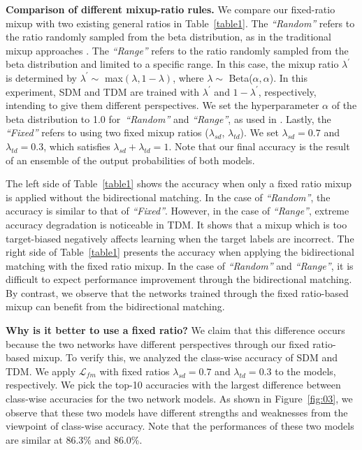 \documentclass[final]{cvpr}
\begin{document}
\textbf{Comparison of different mixup-ratio rules.} We compare our fixed-ratio mixup with two existing general ratios in Table~\ref{table1}. The \emph{“Random”} refers to the ratio randomly sampled from the beta distribution, as in the traditional mixup approaches \cite{MixUp, MiCo2020, VMT, Minghao2020}. The \emph{“Range”} refers to the ratio randomly sampled from the beta distribution and limited to a specific range. In this case, the mixup ratio $\lambda^{\prime}$ is determined by $\lambda^{\prime}\sim$ max$(\lambda, 1- \lambda)$, where $\lambda\sim$ Beta($\alpha,\alpha$). In this experiment, SDM and TDM are trained with $\lambda^{\prime}$ and $1-\lambda^{\prime}$, respectively, intending to give them different perspectives. We set the hyperparameter $\alpha$ of the beta distribution to 1.0 for~\emph{“Random”} and \emph{“Range”}, as used in \cite{MiCo2020, VMT}. Lastly, the \emph{“Fixed”} refers to using two fixed mixup ratios ($\lambda_{sd}$, $\lambda_{td}$). We set $\lambda_{sd}=0.7$ and $\lambda_{td}=0.3$, which satisfies $\lambda_{sd}+\lambda_{td}=1$. Note that our final accuracy is the result of an ensemble of the output probabilities of both models.

The left side of Table~\ref{table1} shows the accuracy when only a fixed ratio mixup is applied without the bidirectional matching. In the case of \emph{“Random”}, the accuracy is similar to that of \emph{“Fixed”}. However, in the case of \emph{“Range”}, extreme accuracy degradation is noticeable in TDM. It shows that a mixup which is too target-biased negatively affects learning when the target labels are incorrect. The right side of Table~\ref{table1} presents the accuracy when applying the bidirectional matching with the fixed ratio mixup. In the case of \emph{“Random”} and \emph{“Range”}, it is difficult to expect performance improvement through the bidirectional matching. By contrast, we observe that the networks trained through the fixed ratio-based mixup can benefit from the bidirectional matching.  

\textbf{Why is it better to use a fixed ratio?} We claim that this difference occurs because the two networks have different perspectives through our fixed ratio-based mixup. To verify this, we analyzed the class-wise accuracy of SDM and TDM. We apply $\mathcal{L}_{fm}$ with fixed ratios $\lambda_{sd}=0.7$ and $\lambda_{td}=0.3$ to the models, respectively. We pick the top-10 accuracies with the largest difference between class-wise accuracies for the two network models. As shown in Figure~\ref{fig:03}, we observe that these two models have different strengths and weaknesses from the viewpoint of class-wise accuracy. Note that the performances of these two models are similar at 86.3\% and 86.0\%.
\end{document}
